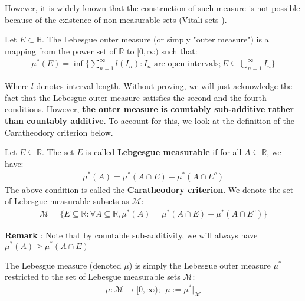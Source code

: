 \noindent However, it is widely known that the construction of such measure is not possible because of the existence of non-measurable sets (Vitali sets \cite{wiki:vitaliset}).

\begin{definition}
    Let $E\subset \mathbb{R}$. The Lebesgue outer measure (or simply "outer measure") is a mapping from the power set of $\mathbb{R}$ to $[0, \infty)$ such that:
    \begin{align*}
        \mu^*(E) = \inf\Bigg\{ \sum_{n=1}^\infty l(I_n) : I_n \text{ are open intervals}; E \subseteq \bigcup_{n=1}^\infty I_n \Bigg\}
    \end{align*}

    \noindent Where $l$ denotes interval length. Without proving, we will just acknowledge the fact that the Lebesgue outer measure satisfies the second and the fourth conditions. However, \textbf{the outer measure is countably sub-additive rather than countably additive}. To account for this, we look at the definition of the Caratheodory criterion below.
\end{definition}

\begin{definition}
    Let $E \subseteq \mathbb{R}$. The set $E$ is called \textbf{Lebgesgue measurable} if for all $A\subseteq \mathbb{R}$, we have:
    \begin{align*}
        \mu^*(A) = \mu^*(A \cap E) + \mu^*(A\cap E^c)
    \end{align*}
    \noindent The above condition is called the \textbf{Caratheodory criterion}. We denote the set of Lebesgue measurable subsets as $\mathcal{M}$:
    \begin{align*}
        \mathcal{M} = \Bigg\{ E \subseteq \mathbb{R} : \forall A \subseteq \mathbb{R}, \mu^*(A) = \mu^*(A \cap E) + \mu^*(A\cap E^c) \Bigg\}
    \end{align*}
\end{definition}

\noindent \newline \textbf{Remark} : Note that by countable sub-additivity, we will always have $\mu^*(A) \ge \mu^*(A\cap E)$

\begin{definition}
    The Lebesgue measure (denoted $\mu$) is simply the Lebesgue outer measure $\mu^*$ restricted to the set of Lebesgue measurable sets $\mathcal{M}$:
    \begin{align*}
        \mu : \mathcal{M} \to [0, \infty); \ \ \mu := \mu^*\Big|_{\mathcal{M}}
    \end{align*}
\end{definition}

